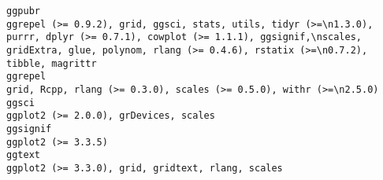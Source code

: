 \documentclass[
  letterpaper,
  DIV=11,
  numbers=noendperiod]{scrreprt}
\begin{document}
\begin{verbatim}
ggpubr                                                                                                                                                                                                                                                                                                                                                                                                 ggrepel (>= 0.9.2), grid, ggsci, stats, utils, tidyr (>=\n1.3.0), purrr, dplyr (>= 0.7.1), cowplot (>= 1.1.1), ggsignif,\nscales, gridExtra, glue, polynom, rlang (>= 0.4.6), rstatix (>=\n0.7.2), tibble, magrittr
ggrepel                                                                                                                                                                                                                                                                                                                                                                                                                                                                                                                                                 grid, Rcpp, rlang (>= 0.3.0), scales (>= 0.5.0), withr (>=\n2.5.0)
ggsci                                                                                                                                                                                                                                                                                                                                                                                                                                                                                                                                                                                ggplot2 (>= 2.0.0), grDevices, scales
ggsignif                                                                                                                                                                                                                                                                                                                                                                                                                                                                                                                                                                                                ggplot2 (>= 3.3.5)
ggtext                                                                                                                                                                                                                                                                                                                                                                                                                                                                                                                                                                   ggplot2 (>= 3.3.0), grid, gridtext, rlang, scales

\end{verbatim}
\end{document}
